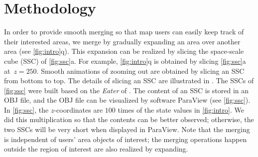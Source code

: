 \documentclass[]{interact}
\begin{document}

















%


\section{Methodology}
\label{sec:methodology}


In order to provide smooth merging
so that map users can easily keep track of their interested areas,
we merge by gradually expanding an area over another area
(see \fig\ref{fig:intro}q).
This expansion can be realized 
by slicing the space-scale cube (SSC) of
\fig\ref{fig:ssc}a.
For example,  \fig\ref{fig:intro}q is obtained by slicing
\fig\ref{fig:ssc}a at~$z= 250$.
Smooth animations of zooming out are obtained by
slicing an SSC from bottom to top.
The details of slicing an SSC are illustrated in \citet{Meijers2020Web}.
The SSCs of \fig\ref{fig:ssc} were built 
based on the \emph{Eater} of \citet{Suba2014Merge}.
The content of an SSC is stored in an OBJ file,
and the OBJ file can be visualized by software ParaView
(see \fig\ref{fig:ssc}).
In \fig\ref{fig:ssc}, the $z$-coordinates are $100$ times of
the state values in \fig\ref{fig:intro}.
We did this multiplication so that the contents can be better observed;
otherwise, the two SSCs will be very short when displayed in ParaView.
Note that the merging is independent of users' area objects of interest;
the merging operations happen outside the region of interest 
are also realized by expanding.
\end{document}
